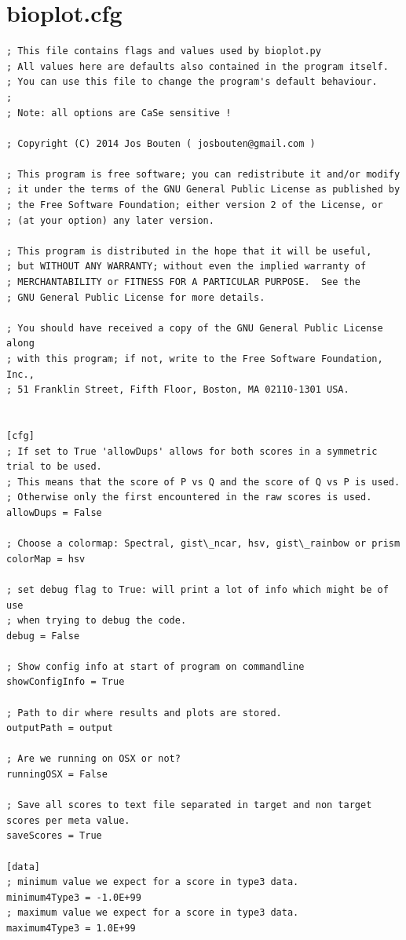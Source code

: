 \documentclass[letterpaper,10pt,english]{sphinxmanual}
\begin{document}
\chapter{bioplot.cfg}
\label{bioplot.cfg::doc}\label{bioplot.cfg:bioplot-cfg}
\begin{Verbatim}[commandchars=\\\{\}]
; This file contains flags and values used by bioplot.py
; All values here are defaults also contained in the program itself.
; You can use this file to change the program's default behaviour.
;
; Note: all options are CaSe sensitive !

; Copyright (C) 2014 Jos Bouten ( josbouten@gmail.com )

; This program is free software; you can redistribute it and/or modify
; it under the terms of the GNU General Public License as published by
; the Free Software Foundation; either version 2 of the License, or
; (at your option) any later version.

; This program is distributed in the hope that it will be useful,
; but WITHOUT ANY WARRANTY; without even the implied warranty of
; MERCHANTABILITY or FITNESS FOR A PARTICULAR PURPOSE.  See the
; GNU General Public License for more details.

; You should have received a copy of the GNU General Public License along
; with this program; if not, write to the Free Software Foundation, Inc.,
; 51 Franklin Street, Fifth Floor, Boston, MA 02110-1301 USA.


[cfg]
; If set to True 'allowDups' allows for both scores in a symmetric trial to be used.
; This means that the score of P vs Q and the score of Q vs P is used.
; Otherwise only the first encountered in the raw scores is used.
allowDups = False

; Choose a colormap: Spectral, gist\_ncar, hsv, gist\_rainbow or prism
colorMap = hsv

; set debug flag to True: will print a lot of info which might be of use
; when trying to debug the code.
debug = False

; Show config info at start of program on commandline
showConfigInfo = True

; Path to dir where results and plots are stored.
outputPath = output

; Are we running on OSX or not?
runningOSX = False

; Save all scores to text file separated in target and non target scores per meta value.
saveScores = True

[data]
; minimum value we expect for a score in type3 data.
minimum4Type3 = -1.0E+99
; maximum value we expect for a score in type3 data.
maximum4Type3 = 1.0E+99


\end{Verbatim}
\end{document}
